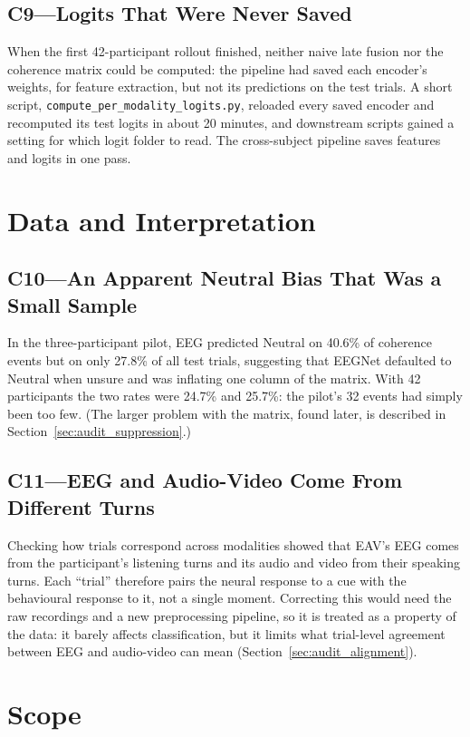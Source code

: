 \subsection*{C9---Logits That Were Never Saved}
\label{sec:c9}
When the first 42-participant rollout finished, neither naive late fusion nor the coherence matrix could be computed: the pipeline had saved each encoder's weights, for feature extraction, but not its predictions on the test trials. A short script, \texttt{compute\_per\_modality\_logits.py}, reloaded every saved encoder and recomputed its test logits in about 20 minutes, and downstream scripts gained a setting for which logit folder to read. The cross-subject pipeline saves features and logits in one pass.

\section{Data and Interpretation}

\subsection*{C10---An Apparent Neutral Bias That Was a Small Sample}
In the three-participant pilot, EEG predicted Neutral on 40.6\% of coherence events but on only 27.8\% of all test trials, suggesting that EEGNet defaulted to Neutral when unsure and was inflating one column of the matrix. With 42 participants the two rates were 24.7\% and 25.7\%: the pilot's 32 events had simply been too few. (The larger problem with the matrix, found later, is described in Section~\ref{sec:audit_suppression}.)

\subsection*{C11---EEG and Audio-Video Come From Different Turns}
\label{sec:listenspeak_asymmetry}
Checking how trials correspond across modalities showed that EAV's EEG comes from the participant's listening turns and its audio and video from their speaking turns. Each ``trial'' therefore pairs the neural response to a cue with the behavioural response to it, not a single moment. Correcting this would need the raw recordings and a new preprocessing pipeline, so it is treated as a property of the data: it barely affects classification, but it limits what trial-level agreement between EEG and audio-video can mean (Section~\ref{sec:audit_alignment}).

\section{Scope}

